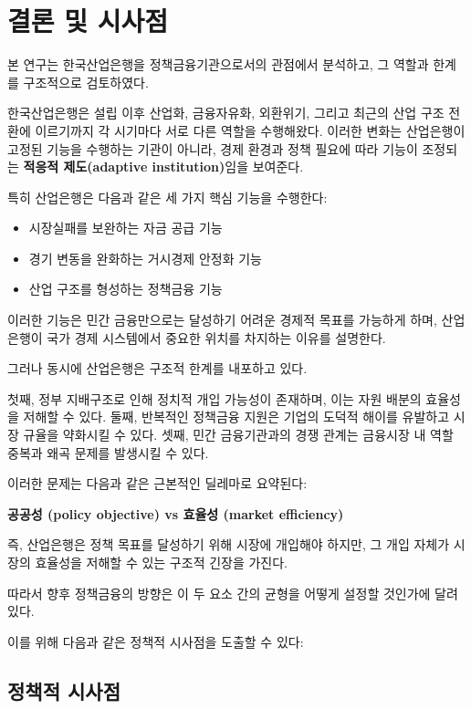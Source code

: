 \section{결론 및 시사점}

본 연구는 한국산업은행을 정책금융기관으로서의 관점에서 분석하고, 그 역할과 한계를 구조적으로 검토하였다.

한국산업은행은 설립 이후 산업화, 금융자유화, 외환위기, 그리고 최근의 산업 구조 전환에 이르기까지 각 시기마다 서로 다른 역할을 수행해왔다. 이러한 변화는 산업은행이 고정된 기능을 수행하는 기관이 아니라, 경제 환경과 정책 필요에 따라 기능이 조정되는 \textbf{적응적 제도(adaptive institution)}임을 보여준다.

특히 산업은행은 다음과 같은 세 가지 핵심 기능을 수행한다:

\begin{itemize}
    \item 시장실패를 보완하는 자금 공급 기능
    \item 경기 변동을 완화하는 거시경제 안정화 기능
    \item 산업 구조를 형성하는 정책금융 기능
\end{itemize}

이러한 기능은 민간 금융만으로는 달성하기 어려운 경제적 목표를 가능하게 하며, 산업은행이 국가 경제 시스템에서 중요한 위치를 차지하는 이유를 설명한다.

그러나 동시에 산업은행은 구조적 한계를 내포하고 있다.

첫째, 정부 지배구조로 인해 정치적 개입 가능성이 존재하며, 이는 자원 배분의 효율성을 저해할 수 있다.  
둘째, 반복적인 정책금융 지원은 기업의 도덕적 해이를 유발하고 시장 규율을 약화시킬 수 있다.  
셋째, 민간 금융기관과의 경쟁 관계는 금융시장 내 역할 중복과 왜곡 문제를 발생시킬 수 있다.

이러한 문제는 다음과 같은 근본적인 딜레마로 요약된다:

\begin{center}
\textbf{공공성 (policy objective) vs 효율성 (market efficiency)}
\end{center}

즉, 산업은행은 정책 목표를 달성하기 위해 시장에 개입해야 하지만, 그 개입 자체가 시장의 효율성을 저해할 수 있는 구조적 긴장을 가진다.

따라서 향후 정책금융의 방향은 이 두 요소 간의 균형을 어떻게 설정할 것인가에 달려 있다.

이를 위해 다음과 같은 정책적 시사점을 도출할 수 있다:

\subsection*{정책적 시사점}

